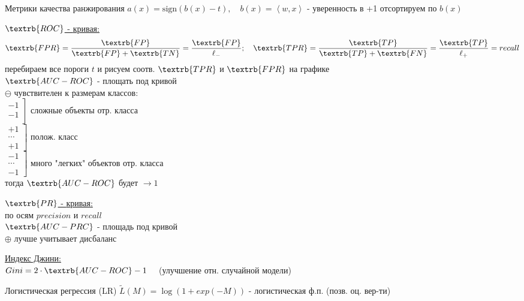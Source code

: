 \documentclass[final]{beamer}
\newlength{\colwidth}
\begin{document}
\begin{frame}[t]
\begin{columns}[t]
\begin{column}{\colwidth}
\begin{block}{Метрики качества ранжирования}
$a(x) = \text{sign} (b(x) - t), \quad b(x) = \left<w, x\right>$ - {\small уверенность в +1}
{\small отсортируем по } $b(x)$ {\small }

\underline{$\textrb{ROC}$ - {\small кривая}:}
\[\textrb{FPR} = \frac{\textrb{FP}}{\textrb{FP} + \textrb{TN}} = \frac{\textrb{FP}}{\ell_{-}} ; \quad \textrb{TPR} = \frac{\textrb{TP}}{\textrb{TP} + \textrb{FN}} = \frac{\textrb{TP}}{\ell_{+}} = recall\]
{\small перебираем все пороги } $t$ {\small и рисуем соотв. } $\textrb{TPR}$ {\small и } $\textrb{FPR}$ {\small на графике}\\
$\textrb{AUC-ROC}$ - {\small площать под кривой}\\
$\ominus$ {\small чувствителен к размерам классов:}\\
$\left.
  \begin{array}{c}
     -1 \\
     -1 \\
  \end{array}
\right]$ {\small сложные объекты отр. класса}\\
$\left.
  \begin{array}{c}
     +1 \\
     \cdots \\
     +1
  \end{array}
\right]$ {\small полож. класс}\\
$\left.
  \begin{array}{c}
     -1 \\
     \cdots \\
     -1
  \end{array}
\right]$ {\small много "легких" объектов отр. класса}\\
{\small тогда } $\textrb{AUC-ROC}$ {\small будет } $\to 1$

\underline{$\textrb{PR}$ - {\small кривая}:}\\
{\small по осям } $precision$ {\small и } $recall$\\
$\textrb{AUC-PRC}$ - {\small площадь под кривой}\\
$\oplus$ {\small лучше учитывает дисбаланс}

\underline{{\small Индекс Джини}:}\\
$Gini = 2 \cdot \textrb{AUC-ROC} - 1 \quad$ {\small (улучшение отн. случайной модели)} 
\end{block}

\begin{block}{Логистическая регрессия (LR)}
$\tilde{L}(M) = \log (1 + exp(-M))$ - {\small логистическая ф.п. (позв. оц. вер-ти)}


\end{block}
\end{column}
\end{columns}
\end{frame}
\end{document}

